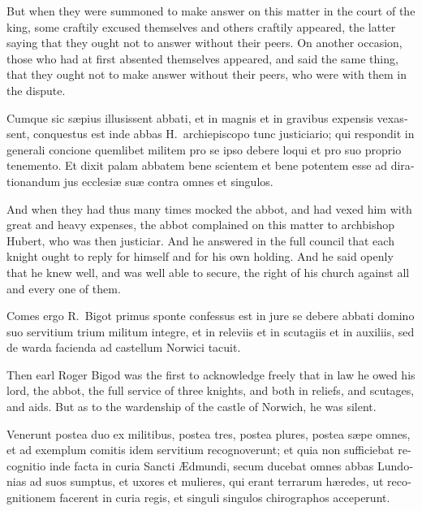 \documentclass[10pt]{book}
\begin{document}
\begin{paracol}{2}
\switchcolumn

But when they were summoned to make answer on this matter in the court of the king, some craftily excused themselves and others craftily appeared, the latter saying that they ought not to answer without their peers. On another occasion, those who had at first absented themselves appeared, and said the same thing, that they ought not to make answer without their peers, who were with them in the dispute.

\switchcolumn*

\begin{otherlanguage}{latin}
Cumque sic s\ae{}pius illusissent abbati, et in magnis et in gravibus expensis vexassent, conquestus est inde abbas H.\ archiepiscopo tunc justiciario; qui respondit in generali concione quemlibet militem pro se ipso debere loqui et pro suo proprio tenemento. Et dixit palam abbatem bene scientem et bene potentem esse ad dirationandum jus ecclesi\ae{} su\ae{} contra omnes et singulos.
\end{otherlanguage}

\switchcolumn

And when they had thus many times mocked the abbot, and had vexed him with great and heavy expenses, the abbot complained on this matter to archbishop Hubert, who was then justiciar. And he answered in the full council that each knight ought to reply for himself and for his own holding. And he said openly that he knew well, and was well able to secure, the right of his church against all and every one of them.

\switchcolumn*

\begin{otherlanguage}{latin}
Comes ergo R.\ Bigot primus sponte confessus est in jure se debere abbati domino suo servitium trium militum integre, et in releviis et in scutagiis et in auxiliis, sed de warda facienda ad castellum Norwici tacuit.
\end{otherlanguage}

\switchcolumn

Then earl Roger Bigod was the first to acknowledge freely that in law he owed his lord, the abbot, the full service of three knights, and both in reliefs, and scutages, and aids. But as to the wardenship of the castle of Norwich, he was silent.

\switchcolumn*

\begin{otherlanguage}{latin}
Venerunt postea duo ex militibus, postea tres, postea plures, postea s\ae{}pe omnes, et ad exemplum comitis idem servitium recognoverunt; et quia non sufficiebat recognitio inde facta in curia Sancti \AE{}dmundi, secum ducebat omnes abbas Lundonias ad suos sumptus, et uxores et mulieres, qui erant terrarum h\ae{}redes, ut recognitionem facerent in curia regis, et singuli singulos chirographos acceperunt. 
\end{otherlanguage}


\end{paracol}
\end{document}
